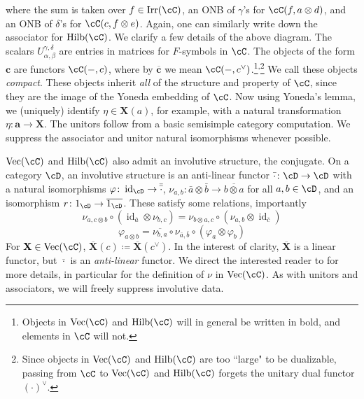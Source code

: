 \documentclass[11pt,reqno]{amsart}
\DeclareMathOperator{\id}{id}
\DeclareMathOperator{\Irr}{Irr}
\DeclareMathOperator{\Vect}{Vec}
\DeclareMathOperator{\Hilb}{Hilb}
\newcommand{\bb}[1]{\mathbf{#1}}
\newcommand{\bbover}[1]{\mathbf{\overline{#1}}}
\numberwithin{equation}{section}
\theoremstyle{plain}
\begin{document}
where the sum is taken over $f \in \Irr(\cC)$, an ONB of $\gamma$'s for $\cC(f, a \otimes d)$, and an ONB of $\delta$'s for $\cC(c, f \otimes e)$.
Again, one can similarly write down the associator for $\Hilb(\cC)$.
We clarify a few details of the above diagram.
The scalars $U^{\gamma, \delta}_{\alpha, \beta}$ are entries in matrices for $F$-symbols in $\cC$.
The objects of the form $\bb c$ are functors $\cC(-, c)$, where by $\bbover c$ we mean $\cC(-, c^\vee)$.\footnote{Objects in $\Vect(\cC)$ and $\Hilb(\cC)$ will in general be written in bold, and elements in $\cC$ will not.}\textsuperscript{,}\footnote{Since objects in $\Vect(\cC)$ and $\Hilb(\cC)$ are too ``large" to be dualizable, passing from $\cC$ to $\Vect(\cC)$ and $\Hilb(\cC)$ forgets the unitary dual functor $(\cdot)^\vee$.}
We call these objects \emph{compact}.
These objects inherit \emph{all} of the structure and property of $\cC$, since they are the image of the Yoneda embedding of $\cC$.
Now using Yoneda's lemma, we (uniquely) identify $\eta \in \bb X(a)$, for example, with a natural transformation $\eta\colon \bb a \to \bb X$.
The unitors follow from a basic semisimple category computation.
We suppress the associator and unitor natural isomorphisms whenever possible.

$\Vect(\cC)$ and $\Hilb(\cC)$ also admit an involutive structure, the conjugate.
On a category $\cD$, an involutive structure is an anti-linear functor $\bar{\cdot} \colon \cD \to \cD$ with a natural isomorphisms $\varphi \colon \id_{\cD} \to \bar{\bar{\cdot}}$, $\nu_{a, b} \colon \bar{a} \otimes \bar{b} \to \overline{b \otimes a}$ for all $a, b \in \cD$, and an isomorphism $r \colon 1_{\cD} \to \overline{1_{\cD}}$.
These satisfy some relations, importantly
\begin{equation} \label{eq:assoc}
\nu_{a, c \otimes b} \circ (\id_{\overline{a}} \otimes \nu_{b, c}) = \nu_{b \otimes a, c} \circ (\nu_{a, b} \otimes \id_{\overline c}) 
\end{equation}
\begin{equation} \label{eq:decomp}
\varphi_{a \otimes b} = \overline{\nu_{b,a}} \circ \nu_{\bar{a}, \bar{b}} \circ (\varphi_a \otimes \varphi_b)
\end{equation}
For $\bb X \in \Vect(\cC)$, $\bbover X (c) \coloneq \bbover X(c^\vee)$.
In the interest of clarity, $\bbover X$ is a linear functor, but $\overline{\cdot}$ is an \emph{anti-linear} functor.
We direct the interested reader to \cite{JP17} for more details, in particular for the definition of $\nu$ in $\Vect(\cC)$.
As with unitors and associators, we will freely suppress involutive data.
\end{document}

